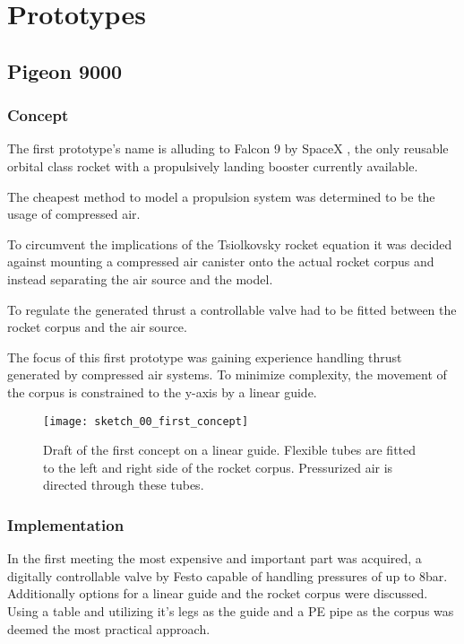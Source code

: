 \chapter{Prototypes}

\section{Pigeon 9000}

\subsection{Concept}
The first prototype's name is alluding to Falcon 9 \cite{falcon9} by SpaceX \cite{spacex}, the only reusable orbital class rocket with a propulsively landing booster currently available. 

The cheapest method to model a propulsion system was determined to be the usage of compressed air. 

To circumvent the implications of the Tsiolkovsky rocket equation \cite{rocket-equation} it was decided against mounting a compressed air canister onto the actual rocket corpus and instead separating the air source and the model.
 

To regulate the generated thrust a controllable valve had to be fitted between the rocket corpus and the air source. 

The focus of this first prototype was gaining experience handling thrust generated by compressed air systems. To minimize complexity, the movement of the corpus is constrained to the y-axis by a linear guide.

\begin{figure}[h]
\centering

\texttt{[image: sketch\_00\_first\_concept]}

\caption{Draft of the first concept on a linear guide. Flexible tubes are fitted to the left and right side of the rocket corpus. Pressurized air is directed through these tubes.}
\end{figure}

   
\subsection{Implementation}
In the first meeting the most expensive and important part was acquired, a digitally controllable valve by Festo \cite{festo-valve} capable of handling pressures of up to 8bar. Additionally options for a linear guide and the rocket corpus were discussed. Using a table and utilizing it's legs as the guide and a PE pipe as the corpus was deemed the most practical approach. 

